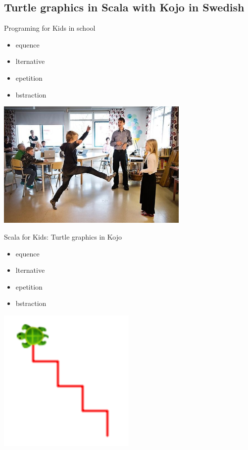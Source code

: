 \documentclass{lecturenotes}
\begin{document}
\subsection[Turtle graphics in Scala with Kojo]{Turtle graphics in Scala with Kojo in Swedish}

\begin{Slide}{Programing for Kids in school}
\begin{multicols}{3}
\begin{itemize}
\item {}equence
\item {}lternative
\item {}epetition
\item {}bstraction
\end{itemize}
\columnbreak
\includegraphics[width=0.7\textwidth]{../../img/unplugged}
\end{multicols}
\end{Slide}


\begin{Slide}{Scala for Kids: Turtle graphics in Kojo}
\begin{multicols}{2}
\begin{itemize}
\item {}equence
\item {}lternative
\item {}epetition
\item {}bstraction
\end{itemize}
\columnbreak
{\includegraphics[width=0.5\textwidth]{../../img/kojo/stairs}}
\end{multicols}
\end{Slide}
\end{document}
